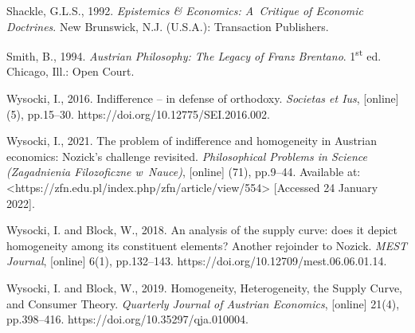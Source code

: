 Shackle, G.L.S., 1992. \textit{Epistemics \& Economics: A~Critique of Economic Doctrines}. New Brunswick, N.J. (U.S.A.): Transaction Publishers.



Smith, B., 1994. \textit{Austrian Philosophy: The Legacy of Franz Brentano}. 1\textsuperscript{st} ed. Chicago, Ill.: Open Court.



Wysocki, I., 2016. Indifference -- in defense of orthodoxy. \textit{Societas et Ius}, [online] (5), pp.15–30. https://doi.org/10.12775/SEI.2016.002.



Wysocki, I., 2021. The problem of indifference and homogeneity in Austrian economics: Nozick's challenge revisited. \textit{Philosophical Problems in Science (Zagadnienia Filozoficzne w~Nauce)}, [online] (71), pp.9–44. Available at: {\textless}https://zfn.edu.pl/index.php/zfn/article/view/554{\textgreater} [Accessed 24 January 2022].



Wysocki, I. and Block, W., 2018. An analysis of the supply curve: does it depict homogeneity among its constituent elements? Another rejoinder to Nozick. \textit{MEST Journal}, [online] 6(1), pp.132–143. https://doi.org/10.12709/mest.06.06.01.14.



Wysocki, I. and Block, W., 2019. Homogeneity, Heterogeneity, the Supply Curve, and Consumer Theory. \textit{Quarterly Journal of Austrian Economics}, [online] 21(4), pp.398–416. https://doi.org/10.35297/qja.010004.



